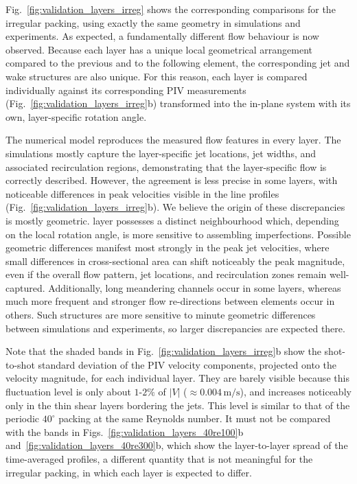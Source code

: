 Fig.~\ref{fig:validation_layers_irreg} shows the corresponding comparisons for the irregular packing, using exactly the same geometry in simulations and experiments. As expected, a fundamentally different flow behaviour is now observed. Because each layer has a unique local geometrical arrangement compared to the previous and to the following element, the corresponding jet and wake structures are also unique. For this reason, each layer is compared individually against its corresponding PIV measurements (Fig.~\ref{fig:validation_layers_irreg}b) transformed into the in-plane system with its own, layer-specific rotation angle.

The numerical model reproduces the measured flow features in every layer. The simulations mostly capture the layer-specific jet locations, jet widths, and associated recirculation regions, demonstrating that the layer-specific flow is correctly described. However, the agreement is less precise in some layers, with noticeable differences in peak velocities visible in the line profiles (Fig.~\ref{fig:validation_layers_irreg}b). We believe the origin of these discrepancies is mostly geometric.    layer possesses a distinct neighbourhood which, depending on the local rotation angle, is more sensitive to assembling imperfections. Possible geometric differences manifest most strongly in the peak jet velocities, where small differences in cross-sectional area can shift noticeably the peak magnitude, even if the overall flow pattern, jet locations, and recirculation zones remain well-captured. Additionally, long meandering channels occur in some layers, whereas much more frequent and stronger flow re-directions between elements occur in others. Such structures are more sensitive to minute geometric differences between simulations and experiments, so larger discrepancies are expected there.

Note that the shaded bands in Fig.~\ref{fig:validation_layers_irreg}b show the shot-to-shot standard deviation of the PIV velocity components, projected onto the velocity magnitude, for each individual layer. They are barely visible because this fluctuation level is only about $1$-$2\%$ of $|V|$ ($\approx 0.004\,\mathrm{m/s}$), and increases noticeably only in the thin shear layers bordering the jets. This level is similar to that of the periodic $40^\circ$ packing at the same Reynolds number. It must not be compared with the bands in Figs.~\ref{fig:validation_layers_40re100}b and~\ref{fig:validation_layers_40re300}b, which show the layer-to-layer spread of the time-averaged profiles, a different quantity that is not meaningful for the irregular packing, in which each layer is expected to differ.

